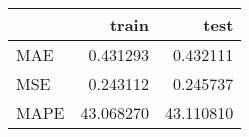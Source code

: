 \begin{tabular}{lrr}
\toprule
{} &      train &       test \\
\midrule
MAE  &   0.431293 &   0.432111 \\
MSE  &   0.243112 &   0.245737 \\
MAPE &  43.068270 &  43.110810 \\
\bottomrule
\end{tabular}
